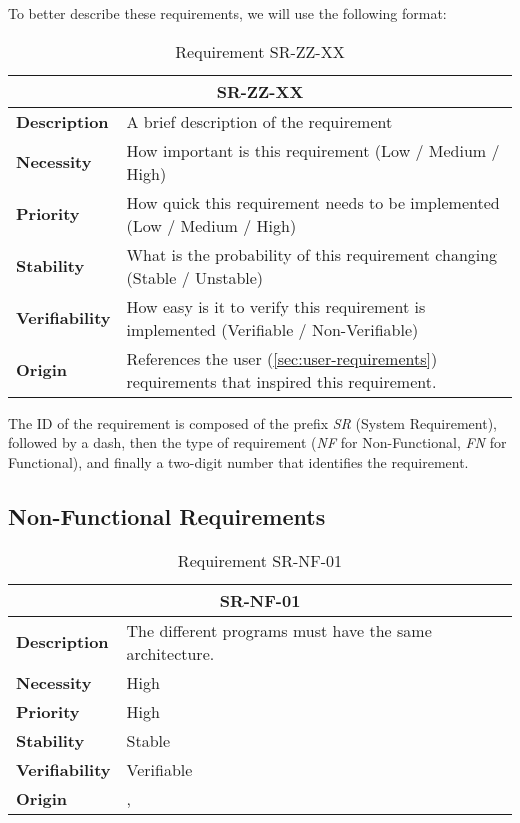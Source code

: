 To better describe these requirements, we will use the following format:

\begin{table}
    \centering
    \begin{tabular}{l p{10cm}}
        \toprule
        \multicolumn{2}{c}{SR-ZZ-XX} \\
        \toprule
        \textbf{Description}        & A brief description of the requirement \\
        \textbf{Necessity}          & How important is this requirement (Low / Medium / High) \\
        \textbf{Priority}           & How quick this requirement needs to be implemented (Low / Medium / High) \\
        \textbf{Stability}          & What is the probability of this requirement changing (Stable / Unstable) \\
        \textbf{Verifiability}      & How easy is it to verify this requirement is implemented (Verifiable / Non-Verifiable) \\
        \textbf{Origin}             & References the user (\autoref{sec:user-requirements}) requirements that inspired this requirement.  \\
    \end{tabular}
    \caption{Requirement SR-ZZ-XX}
\end{table}

The ID of the requirement is composed of the prefix \textit{SR} (System Requirement), followed by a dash, then the type of requirement (\textit{NF} for Non-Functional, \textit{FN} for Functional), and finally a two-digit number that identifies the requirement.

\subsection{Non-Functional Requirements}
\begin{table}[H]
    \centering
    \begin{tabular}{l p{10cm}}
        \toprule
        \multicolumn{2}{c}{SR-NF-01} \\
        \toprule
        \textbf{Description}        & The different programs must have the same architecture. \\
        \textbf{Necessity}          &  High \\
        \textbf{Priority}           &  High \\
        \textbf{Stability}          &  Stable \\
        \textbf{Verifiability}      & Verifiable \\
        \textbf{Origin}             &  \textit{\nameref{tab:ur-re-01}}, \textit{\nameref{tab:ur-ca-14}} \\
    \end{tabular}
    \caption{Requirement SR-NF-01}
    \label{tab:sr-nf-01}
\end{table}

